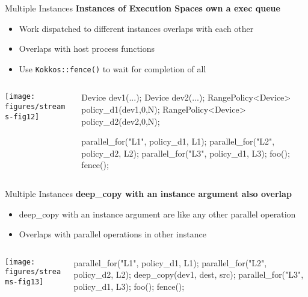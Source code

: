 \begin{frame}[fragile]{Multiple Instances}
  \textbf{Instances of Execution Spaces own a exec queue}
  \begin{itemize}
    \item{Work dispatched to different instances overlaps with each other}
    \item{Overlaps with host process functions}
    \item{Use \texttt{Kokkos::fence()} to wait for completion of all}
  \end{itemize}

  \begin{columns}[]
    \begin{column}{.67\textwidth}

       \texttt{[image: figures/streams-fig12]} 
 
    \end{column}

    \begin{column}{.33\textwidth}
	    \begin{code}[linebackgroundcolor={},keywords={L1,L2,policy_device}]
Device dev1(...);
Device dev2(...);
RangePolicy<Device>
  policy_d1(dev1,0,N);
RangePolicy<Device>
  policy_d2(dev2,0,N);

parallel_for("L1", 
  policy_d1, L1);
parallel_for("L2", 
  policy_d2, L2);
parallel_for("L3", 
  policy_d1, L3);
foo();
fence();
      \end{code}
    \end{column}
  \end{columns}
\end{frame}


\begin{frame}[fragile]{Multiple Instances}
  \textbf{deep\_copy with an instance argument also overlap}
  \begin{itemize}
    \item{deep\_copy with an instance argument are like any other parallel operation}
    \item{Overlaps with parallel operations in other instance}
  \end{itemize}

  \begin{columns}[]
    \begin{column}{.67\textwidth}

       \texttt{[image: figures/streams-fig13]} 
 
    \end{column}

    \begin{column}{.33\textwidth}
	    \begin{code}[linebackgroundcolor={},keywords={L1,L2,policy_device}]
parallel_for("L1", 
  policy_d1, L1);
parallel_for("L2", 
  policy_d2, L2);
deep_copy(dev1,
  dest, src);
parallel_for("L3", 
  policy_d1, L3);
foo();
fence();
      \end{code}
    \end{column}
  \end{columns}
\end{frame}

